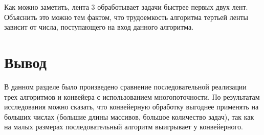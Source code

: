 Как можно заметить, лента 3 обработывает задачи быстрее первых двух лент. Объяснить это можно тем фактом, что трудоемкость алгоритма тертьей ленты зависит от числа, поступающего на вход данного алгоритма.


\section*{Вывод}

В данном разделе было произведено сравнение последовательной реализации трех алгоритмов и конвейера с использованием многопоточности. По результатам исследования можно сказать, что конвейерную обработку выгоднее применять на больших числах (большие длины массивов, большое количество задач), так как на малых размерах последовательный алгоритм выигрывает у конвейерного.